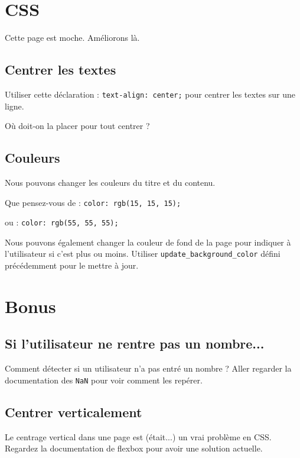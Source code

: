 \documentclass{article} %
\newcommand{\codeCSSinline}[2] {
	#1 : \texttt{#2} 
  }
\begin{document}
\section{CSS}

Cette page est moche. Améliorons là.

\subsection{Centrer les textes}

Utiliser \codeCSSinline{cette déclaration}{text-align: center;} pour centrer les textes sur une ligne. 

Où doit-on la placer pour tout centrer ?

\subsection{Couleurs}

Nous pouvons changer les couleurs du titre et du contenu. 

Que pensez-vous \codeCSSinline{de}{color: rgb(15, 15, 15);} \codeCSSinline{ou}{color: rgb(55, 55, 55);}

Nous pouvons également changer la couleur de fond de la page pour indiquer à l'utilisateur si c'est plus ou moins. Utiliser \texttt{update\_background\_color} défini précédemment pour le mettre à jour.

\section{Bonus}

\subsection{Si l'utilisateur ne rentre pas un nombre...}

Comment détecter si un utilisateur n'a pas entré un nombre ? Aller regarder la documentation des \texttt{NaN} pour voir comment les repérer.

\subsection{Centrer verticalement}

Le centrage vertical dans une page est (était...) un vrai problème en CSS. Regardez la documentation de flexbox pour avoir une solution actuelle.
\end{document}

